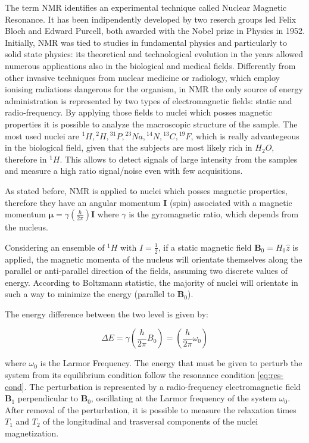 \documentclass[12pt,a4paper]{report}
\begin{document}
The term NMR identifies an experimental technique called Nuclear Magnetic Resonance.
It has been indipendently developed by two reserch groups led Felix Bloch and Edward Purcell, both awarded with the Nobel prize in Physics in 1952. 
Initially, NMR was tied to studies in fundamental physics and particularly to solid state physics: its theoretical and technological evolution in the years allowed numerous applications also in the biological and medical fields.    
Differently from other invasive techniques from nuclear medicine or radiology, which employ ionising radiations dangerous for the organism, in NMR the only source of energy administration is represented by two types of electromagnetic fields: static and radio-frequency.
By applying those fields to nuclei which posses magnetic properties it is possible to analyze the macroscopic structure of the sample. 
The most used nuclei are ${}^1H, {}^2H, {}^{31}P, {}^{23}Na, {}^{14}N, {}^{13}C, {}^{19}F$, which is really advantegeous in the biological field, given that the subjects are most likely rich in $H_2O$, therefore in ${}^1H$. 
This allows to detect signals of large intensity from the samples and measure a high ratio signal/noise even with few acquisitions.

As stated before, NMR is applied to nuclei which posses magnetic properties, therefore they have an angular momentum $\bm{I}$ (spin) associated with a magnetic momentum $\bm{\mu} = \gamma(\frac{h}{2\pi})\bm{I}$ where $\gamma$ is the gyromagnetic ratio, which depends from the nucleus.

Considering an ensemble of ${}^1H$ with $I = \frac{1}{2}$, if a static magnetic field $\bm{B}_0 = H_0 \hat z$ is applied, the magnetic momenta of the nucleus will orientate themselves along the parallel or anti-parallel direction of the fields, assuming two discrete values of energy. 
According to Boltzmann statistic, the majority of nuclei will orientate in such a way to minimize the energy (parallel to $\bm{B}_0$).

The energy difference between the two level is given by: 

\begin{equation}
 \Delta E = \gamma \left(\frac{h}{2\pi}B_0\right) = \left(\frac{h}{2\pi}\omega_0\right)
 \label{eq:res-cond}
\end{equation}

where $\omega_0$ is the Larmor Frequency.
The energy that must be given to perturb the system from its equilibrium condition follow the resonance condition \ref{eq:res-cond}. 
The perturbation is represented by a radio-frequency electromagnetic field $\bm{B}_1$ perpendicular to $\bm{B}_0$, oscillating at the Larmor frequency of the system $\omega_0$.
After removal of the perturbation, it is possible to measure the relaxation times $T_1$ and $T_2$ of the longitudinal and trasversal components of the nuclei magnetization. 
\end{document}

